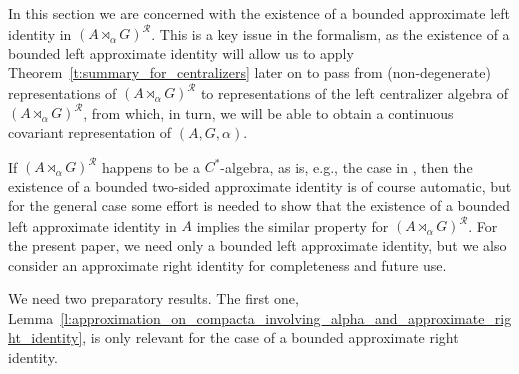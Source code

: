 \documentclass{amsart}
\theoremstyle{plain}
\theoremstyle{definition}
\numberwithin{equation}{section}
\begin{document}
In this section we are concerned with the existence of a bounded approximate left identity in ${(A {\rtimes}_\alpha G)^\mathcal{R}}$. This is a key issue in the formalism, as the existence of a bounded left approximate identity will allow us to apply Theorem~\ref{t:summary_for_centralizers} later on to pass from (non-degenerate) representations of ${(A {\rtimes}_\alpha G)^\mathcal{R}}$ to representations of the left centralizer algebra of ${(A {\rtimes}_\alpha G)^\mathcal{R}}$, from which, in turn, we will be able to obtain a continuous covariant representation of ${(A,G,\alpha)}$.

If ${(A {\rtimes}_\alpha G)^\mathcal{R}}$ happens to be a $C^*$-algebra, as is, e.g., the case in \cite{williams}, then the existence of a bounded two-sided approximate identity is of course automatic, but for the general case some effort is needed to show that the existence of a bounded left approximate identity in $A$ implies the similar property for ${(A {\rtimes}_\alpha G)^\mathcal{R}}$. For the present paper, we need only a bounded left approximate identity, but we also consider an approximate right identity for completeness and future use.

We need two preparatory results. The first one, Lemma~\ref{l:approximation_on_compacta_involving_alpha_and_approximate_right_identity}, is only relevant for the case of a bounded approximate right identity.
\end{document}
